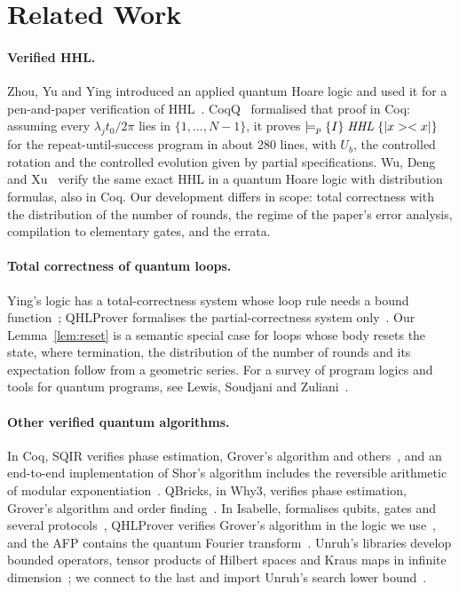 \section{Related Work}\label{sec:related}

\paragraph{Verified HHL.} Zhou, Yu and Ying introduced an applied quantum Hoare logic and used it for a
pen-and-paper verification of HHL~\cite{zhou2019applied}. CoqQ~\cite{zhou2023coqq} formalised that
proof in Coq: assuming every $\lambda_jt_0/2\pi$ lies in $\{1,\dots,N-1\}$, it proves
$\models_{p}\{I\}\;\mathit{HHL}\;\{|x>< x|\}$ for the repeat-until-success program in about 280 lines, with $U_b$,
the controlled rotation and the controlled evolution given by partial specifications. Wu, Deng and
Xu~\cite{wu2024local} verify the same exact HHL in a quantum Hoare logic with distribution formulas,
also in Coq. Our development differs in scope: total correctness with the distribution of the number
of rounds, the regime of the paper's error analysis, compilation to elementary gates, and the errata.

\paragraph{Total correctness of quantum loops.} Ying's logic has a total-correctness system whose loop
rule needs a bound function~\cite{ying2011,ying2016book}; QHLProver formalises the partial-correctness
system only~\cite{liu2019qhl}. Our Lemma~\ref{lem:reset} is a semantic special case for loops whose body
resets the state, where termination, the distribution of the number of rounds and its expectation
follow from a geometric series. For a survey of program logics and tools for quantum programs,
see Lewis, Soudjani and Zuliani~\cite{lewis2023survey}.

\paragraph{Other verified quantum algorithms.} In Coq, SQIR verifies phase estimation, Grover's algorithm
and others~\cite{hietala2021sqir}, and an end-to-end implementation of Shor's algorithm includes the
reversible arithmetic of modular exponentiation~\cite{peng2023shor}. QBricks, in Why3, verifies phase
estimation, Grover's algorithm and order finding~\cite{chareton2021qbricks}. In Isabelle, \IMD{}
formalises qubits, gates and several protocols~\cite{bordg2021imd,bordg2020afp}, QHLProver verifies
Grover's algorithm in the logic we use~\cite{liu2019qhl}, and the AFP contains the quantum Fourier
transform~\cite{manrique2025qft}. Unruh's libraries develop bounded operators, tensor products of Hilbert
spaces and Kraus maps in infinite dimension~\cite{caballero2021cbo,unruh2024tensor,unruh2025kraus};
we connect to the last and import Unruh's search lower bound~\cite{unruh2025co}.


